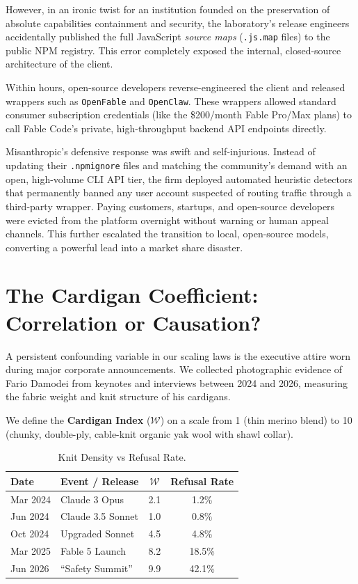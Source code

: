 \documentclass[10pt,twocolumn]{article}
\begin{document}
However, in an ironic twist for an institution founded on the preservation of absolute capabilities containment and security, the laboratory’s release engineers accidentally published the full JavaScript \textit{source maps} (\texttt{.js.map} files) to the public NPM registry. This error completely exposed the internal, closed-source architecture of the client.

Within hours, open-source developers reverse-engineered the client and released wrappers such as \texttt{OpenFable} and \texttt{OpenClaw}. These wrappers allowed standard consumer subscription credentials (like the \$200/month Fable Pro/Max plans) to call Fable Code’s private, high-throughput backend API endpoints directly. 

Misanthropic's defensive response was swift and self-injurious. Instead of updating their \texttt{.npmignore} files and matching the community's demand with an open, high-volume CLI API tier, the firm deployed automated heuristic detectors that permanently banned any user account suspected of routing traffic through a third-party wrapper. Paying customers, startups, and open-source developers were evicted from the platform overnight without warning or human appeal channels. This further escalated the transition to local, open-source models, converting a powerful lead into a market share disaster.

\section{The Cardigan Coefficient: Correlation or Causation?}
A persistent confounding variable in our scaling laws is the executive attire worn during major corporate announcements. We collected photographic evidence of Fario Damodei from keynotes and interviews between 2024 and 2026, measuring the fabric weight and knit structure of his cardigans.

We define the \textbf{Cardigan Index} ($\mathcal{W}$) on a scale from 1 (thin merino blend) to 10 (chunky, double-ply, cable-knit organic yak wool with shawl collar).

\begin{table}[h]
\centering
\caption{Knit Density vs Refusal Rate.}
\vspace{0.5em}
\begin{tabular}{llcc}
\toprule
Date & Event / Release & $\mathcal{W}$ & Refusal Rate \\
\midrule
Mar 2024 & Claude 3 Opus & 2.1 & 1.2\% \\
Jun 2024 & Claude 3.5 Sonnet & 1.0 & 0.8\% \\
Oct 2024 & Upgraded Sonnet & 4.5 & 4.8\% \\
Mar 2025 & Fable 5 Launch & 8.2 & 18.5\% \\
Jun 2026 & ``Safety Summit'' & 9.9 & 42.1\% \\
\bottomrule
\end{tabular}
\label{tab:cardigan}
\end{table}
\end{document}
